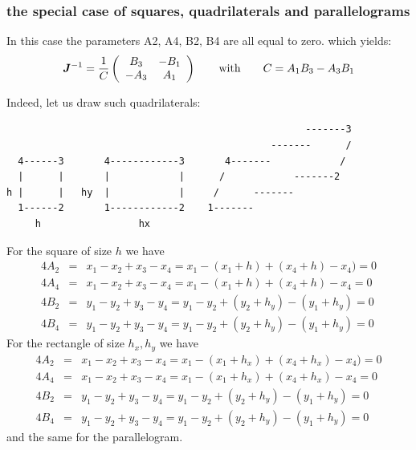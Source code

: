 \subsubsection{the special case of squares, quadrilaterals and parallelograms}

In this case the parameters A2, A4, B2, B4 are all equal to zero.
which yields:
\[
{\bm J}^{-1} = \frac{1}{C}
\left(
\begin{array}{cc}
B_3  & -B_1  \\
-A_3  & A_1 
\end{array}
\right)
\qquad 
{\rm with }
\qquad
C= A_1B_3-A_3  B_1 
\]

Indeed, let us draw such quadrilaterals:

\begin{verbatim}                
                                                    -------3
                                              -------      /
  4------3       4------------3       4-------            /
  |      |       |            |      /            -------2
h |      |   hy  |            |     /      ------- 
  1------2       1------------2    1-------
     h                 hx  
\end{verbatim}



For the square of size $h$ we have 
\begin{eqnarray}
4A_2 &=& x_1 -x_2 +x_3 -x_4 = x_1 -(x_1+h) +(x_4+h) -x_4) =0 \nonumber\\
4A_4 &=& x_1 -x_2 +x_3 -x_4 = x_1 -(x_1+h) +(x_4+h) -x_4  =0 \nonumber\\
4B_2 &=& y_1 -y_2 +y_3 -y_4 = y_1 -y_2 + (y_2+h_y) -(y_1+h_y) = 0 \nonumber\\
4B_4 &=& y_1 -y_2 +y_3 -y_4 = y_1 -y_2 + (y_2+h_y) -(y_1+h_y) = 0 \nonumber
\end{eqnarray}
For the rectangle of size $h_x,h_y$ we have 
\begin{eqnarray}
4A_2 &=& x_1 -x_2 +x_3 -x_4 = x_1 -(x_1+h_x) +(x_4+h_x) -x_4) =0 \nonumber\\
4A_4 &=& x_1 -x_2 +x_3 -x_4 = x_1 -(x_1+h_x) +(x_4+h_x) -x_4  =0 \nonumber\\
4B_2 &=& y_1 -y_2 +y_3 -y_4 = y_1 -y_2 + (y_2+h_y) -(y_1+h_y) = 0 \nonumber\\
4B_4 &=& y_1 -y_2 +y_3 -y_4 = y_1 -y_2 + (y_2+h_y) -(y_1+h_y) = 0 \nonumber
\end{eqnarray}
and the same for the parallelogram.

